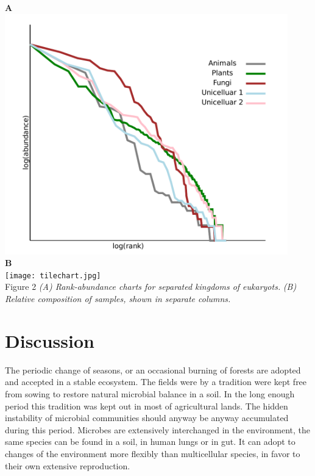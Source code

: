\documentclass[a4paper]{article}
\begin{document}
\newpage

{\large{\textbf{A}}}\\
\includegraphics[width=0.92\textwidth]{rankabundance.jpg}\\
{\large{\textbf{B}}}\\
\texttt{[image: tilechart.jpg]}\\

Figure 2 \textit{(A) Rank-abundance charts for separated kingdoms of eukaryots.}
\textit{(B) Relative composition of samples, shown in separate columns.}







\section*{Discussion}


The periodic change of seasons, or an occasional burning of forests are adopted and accepted in a stable ecosystem. The fields were by a tradition were kept free from sowing to restore natural microbial balance in a soil. In the long enough period this tradition was kept out in most of agricultural lands. The hidden instability of microbial communities should anyway be anyway accumulated during this period. Microbes are extensively interchanged in the environment, the same species can be found in a soil, in human lungs or in gut. It can adopt to changes of the environment more flexibly than multicellular species, in favor to their own extensive reproduction.
\end{document}
